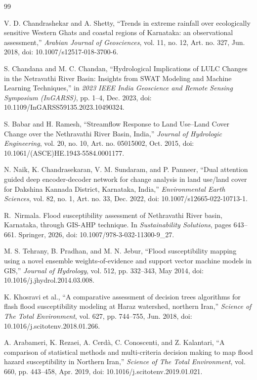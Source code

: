 \documentclass[10pt,twocolumn]{article}
\begin{document}
\balance
{\fontsize{8}{9.5}\selectfont
\begin{thebibliography}{99}
\setlength{\itemsep}{0pt}

V. D. Chandrashekar and A. Shetty, ``Trends in extreme rainfall over ecologically sensitive Western Ghats and coastal regions of Karnataka: an observational assessment,'' \emph{Arabian Journal of Geosciences}, vol. 11, no. 12, Art. no. 327, Jun. 2018, doi: 10.1007/s12517-018-3700-6.

S. Chandana and M. C. Chandan, ``Hydrological Implications of LULC Changes in the Netravathi River Basin: Insights from SWAT Modeling and Machine Learning Techniques,'' in \emph{2023 IEEE India Geoscience and Remote Sensing Symposium (InGARSS)}, pp. 1--4, Dec. 2023, doi: 10.1109/InGARSS59135.2023.10490324.

S. Babar and H. Ramesh, ``Streamflow Response to Land Use--Land Cover Change over the Nethravathi River Basin, India,'' \emph{Journal of Hydrologic Engineering}, vol. 20, no. 10, Art. no. 05015002, Oct. 2015, doi: 10.1061/(ASCE)HE.1943-5584.0001177.

N. Naik, K. Chandrasekaran, V. M. Sundaram, and P. Panneer, ``Dual attention guided deep encoder-decoder network for change analysis in land use/land cover for Dakshina Kannada District, Karnataka, India,'' \emph{Environmental Earth Sciences}, vol. 82, no. 1, Art. no. 33, Dec. 2022, doi: 10.1007/s12665-022-10713-1.

R.~Nirmala. Flood susceptibility assessment of Nethravathi River basin, Karnataka, through GIS-AHP technique. In \emph{Sustainability Solutions}, pages 643--661. Springer, 2026, doi: 10.1007/978-3-032-11300-9\_27.

M. S. Tehrany, B. Pradhan, and M. N. Jebur, ``Flood susceptibility mapping using a novel ensemble weights-of-evidence and support vector machine models in GIS,'' \emph{Journal of Hydrology}, vol. 512, pp. 332--343, May 2014, doi: 10.1016/j.jhydrol.2014.03.008.

K. Khosravi et al., ``A comparative assessment of decision trees algorithms for flash flood susceptibility modeling at Haraz watershed, northern Iran,'' \emph{Science of The Total Environment}, vol. 627, pp. 744--755, Jun. 2018, doi: 10.1016/j.scitotenv.2018.01.266.

A. Arabameri, K. Rezaei, A. Cerdà, C. Conoscenti, and Z. Kalantari, ``A comparison of statistical methods and multi-criteria decision making to map flood hazard susceptibility in Northern Iran,'' \emph{Science of The Total Environment}, vol. 660, pp. 443--458, Apr. 2019, doi: 10.1016/j.scitotenv.2019.01.021.


\end{thebibliography}}
\end{document}
